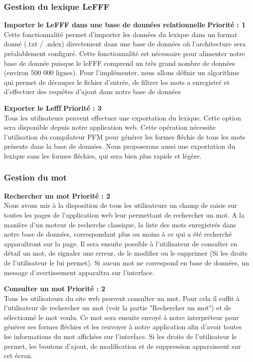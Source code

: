 \documentclass[12pt,a4paper]{article}
\begin{document}
 \subsubsection{Gestion du lexique LeFFF}
\textbf{Importer le LeFFF dans une base de données relationnelle}
\textbf{Priorité : 1} \\ 
Cette fonctionnalité permet d'importer les données du lexique dans un format donné (.txt / .mlex) directement dans une base de données où l'architecture sera préalablement configuré.
Cette fonctionnalité est nécessaire pour alimenter notre base de donnée puisque le leFFF comprend un très grand nombre de données (environ 500 000 lignes).
Pour l'implémenter, nous allons définir un algorithme qui permet de découper le fichier d'entrée, de filtrer les mots a enregistré et d'effectuer des requêtes d'ajout dans notre base de données

 \textbf{ Exporter le Lefff}
\textbf{Priorité : 3}  \\
Tous les utilisateurs peuvent effectuer une exportation du lexique. Cette option sera disponible depuis notre application web. Cette opération nécessite l'utilisation du compilateur PFM pour générer les formes fléchis de tous les mots présents dans la base de données.
Nous proposerons aussi une exportation du lexique sans les formes fléchies, qui sera bien plus rapide et légère.
\subsubsection{Gestion du mot}
\textbf{Rechercher un mot}
 \textbf{Priorité : 2}
\\ Nous avons mis à la disposition de tous les utilisateurs un champ de saisie sur toutes les pages de l'application web leur permettant de rechercher un mot. A la manière d'un moteur de recherche classique, la liste des mots enregistrés dans notre base de données, correspondant plus ou moins à ce qui a été recherché apparaîtront sur la page. Il sera ensuite possible à l'utilisateur de consulter en détail un mot, de signaler une erreur, de le modifier ou le supprimer (Si les droits de l'utilisateur le lui permet). Si aucun mot ne correspond en base de données, un message d'avertissement apparaîtra sur l'interface.


\textbf{Consulter un mot}
 \textbf{Priorité : 2}
\\ Tous les utilisateurs du site web peuvent consulter un mot. Pour cela il suffit à l'utilisateur de rechercher un mot (voir la partie "Rechercher un mot") et de sélectionné le mot voulu. Ce mot sera ensuite envoyé à notre interpréteur pour générer ses formes fléchies et les renvoyer à notre application afin d'avoir toutes les informations du mot affichées sur l'interface.
Si les droits de l'utilisateur le permet, les boutons d'ajout, de modification et de suppression apparaissent sur cet écran.
\end{document}
